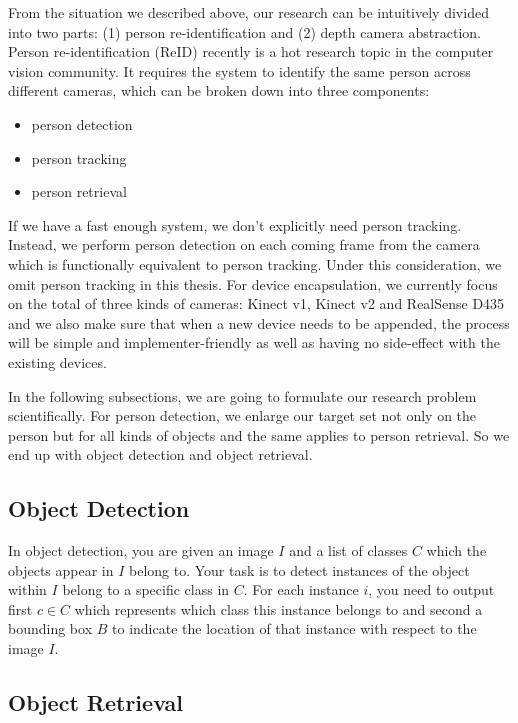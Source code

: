 
From the situation we described above, our research can be
intuitively divided into two parts: 
(1) person re-identification and
(2) depth camera abstraction.
Person re-identification (ReID) recently is a hot research topic in the
computer vision community. It requires the system to identify the same person
across different cameras, which can be broken down into three components:

\begin{itemize}
    \item person detection
    \item person tracking
    \item person retrieval
\end{itemize}

If we have a fast enough system, we don't explicitly need person tracking.
Instead, we perform person detection on each coming frame from the camera which
is functionally equivalent to person tracking. Under this consideration, we
omit person tracking in this thesis.
For device encapsulation, we  currently focus on the total of three kinds of
cameras: Kinect v1, Kinect v2 and RealSense D435 and we also make sure that when
a new device needs to be appended, the process will be simple and
implementer-friendly as well as having no side-effect with the existing devices.

In the following subsections, we are going to formulate our
research problem scientifically. For person detection, we enlarge our target
set not only on the person but for all kinds of objects and the same applies to
person retrieval. So we end up with object detection and object retrieval.

\subsection{Object Detection}

In object detection, you are given an image $I$ and a list of classes $C$ which
the objects
appear in $I$ belong to. Your task is to detect instances of the object within
$I$ belong to a specific class in $C$.
For each instance $i$, you need to output first $c \in C$ which represents which class
this instance belongs to and second
a bounding box $B$ to indicate the location of that instance with respect to the
image $I$.

\subsection{Object Retrieval}

